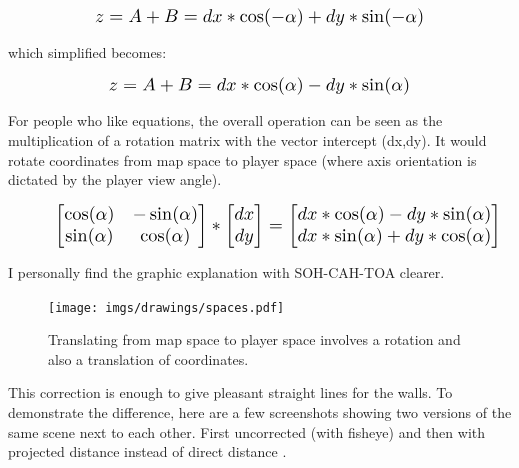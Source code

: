 \begin{figure}[H]
  \centering
  \begin{equation*}
    \scalebox{1.3}{
$z = A + B = dx * \cos(-\alpha) + dy * \sin(-\alpha) $ 
 }
  \end{equation*}
\end{figure}
which simplified becomes: 

\begin{figure}[H]
  \centering
  \begin{equation*}
    \scalebox{1.3}{
$z = A + B = dx * \cos(\alpha) - dy * \sin(\alpha) $
 }
  \end{equation*}
\end{figure}
\par
For people who like equations, the overall operation can be seen as the multiplication of a rotation matrix with the vector intercept (dx,dy). It would rotate coordinates from map space to player space (where axis orientation is dictated by the player view angle). \label{rotatematrix}
\begin{figure}[H]
  \centering
  \begin{equation*}
    \scalebox{1.3}{
    $
      \begin{bmatrix} 
        \cos(\alpha) & -\sin(\alpha) \\ 
        \sin(\alpha) & \cos(\alpha) 
      \end{bmatrix} 
       *
      \begin{bmatrix} 
        dx \\ 
        dy 
      \end{bmatrix}
       =
      \begin{bmatrix} 
        dx*\cos(\alpha) - dy*\sin(\alpha) \\ 
        dx*\sin(\alpha) + dy*\cos(\alpha) 
      \end{bmatrix} 
      $
    }
  \end{equation*}
\end{figure}
\par
I personally find the graphic explanation with SOH-CAH-TOA clearer.\\
\par
\begin{figure}[H]
\centering
 \texttt{[image: imgs/drawings/spaces.pdf]}
 \caption{Translating from map space to player space involves a rotation and also a translation of coordinates.}
 \end{figure}



\par
This correction is enough to give pleasant straight lines for the walls. To demonstrate the difference, here are a few screenshots showing two versions of the same scene next to each other. First uncorrected (with fisheye) and then with projected distance  instead of direct distance .\\

